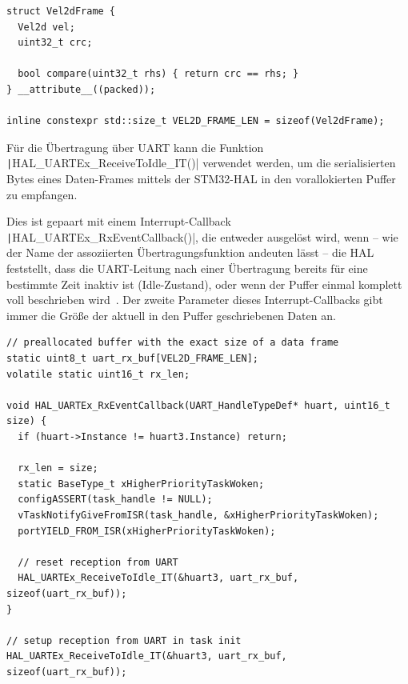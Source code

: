 \begin{code}
\begin{verbatim}
struct Vel2dFrame {
  Vel2d vel;
  uint32_t crc;

  bool compare(uint32_t rhs) { return crc == rhs; }
} __attribute__((packed));

inline constexpr std::size_t VEL2D_FRAME_LEN = sizeof(Vel2dFrame);
\end{verbatim}
\end{code}

Für die Übertragung über UART kann die Funktion
\texttt|HAL_UARTEx_ReceiveToIdle_IT()| verwendet werden, um die
serialisierten Bytes eines Daten-Frames mittels der STM32-HAL in den
vorallokierten Puffer zu empfangen.

Dies ist gepaart mit einem Interrupt-Callback
\texttt|HAL_UARTEx_RxEventCallback()|, die entweder ausgelöst wird,
wenn -- wie der Name der assoziierten Übertragungsfunktion andeuten lässt -- die
HAL feststellt, dass die UART-Leitung nach einer Übertragung bereits für eine
bestimmte Zeit inaktiv ist (Idle-Zustand), oder wenn der Puffer einmal komplett
voll beschrieben wird~\cite{HAL_UARTEx_ReceiveToIdle_IT}. Der zweite Parameter
dieses Interrupt-Callbacks gibt immer die Größe der aktuell in den Puffer
geschriebenen Daten an.

\begin{code}
\begin{verbatim}
// preallocated buffer with the exact size of a data frame
static uint8_t uart_rx_buf[VEL2D_FRAME_LEN];
volatile static uint16_t rx_len;

void HAL_UARTEx_RxEventCallback(UART_HandleTypeDef* huart, uint16_t size) {
  if (huart->Instance != huart3.Instance) return;

  rx_len = size;
  static BaseType_t xHigherPriorityTaskWoken;
  configASSERT(task_handle != NULL);
  vTaskNotifyGiveFromISR(task_handle, &xHigherPriorityTaskWoken);
  portYIELD_FROM_ISR(xHigherPriorityTaskWoken);

  // reset reception from UART
  HAL_UARTEx_ReceiveToIdle_IT(&huart3, uart_rx_buf, sizeof(uart_rx_buf));
}

// setup reception from UART in task init
HAL_UARTEx_ReceiveToIdle_IT(&huart3, uart_rx_buf, sizeof(uart_rx_buf));
\end{verbatim}
    \label{code:uart_isr}
\end{code}

